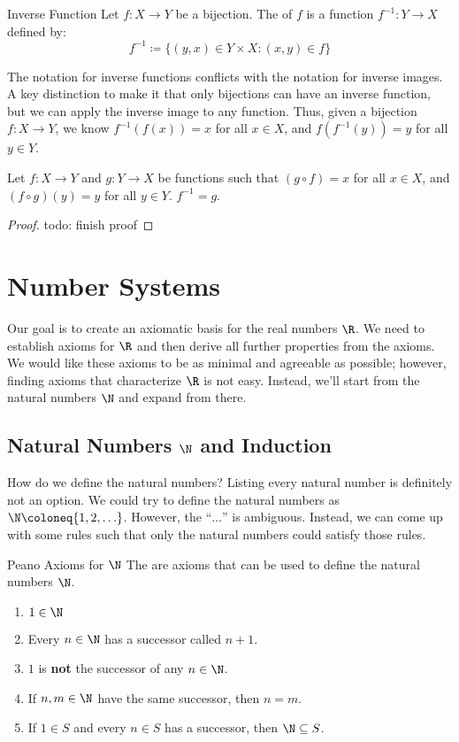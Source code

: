 \documentclass[12pt]{report}
\begin{document}
\begin{dfnbox}{Inverse Function}{}
    Let $f : X \to Y$ be a bijection. The  of $f$ is a function $f^{-1} : Y \to X$ defined by:
    \[ f^{-1} \coloneq \{ (y,x) \in Y \times X : (x,y) \in f \} \]
\end{dfnbox}

The notation for inverse functions conflicts with the notation for inverse images. A key distinction to make it that only bijections can have an inverse function, but we can apply the inverse image to any function. Thus, given a bijection $f : X \to Y$, we know $f^{-1}(f(x)) = x$ for all $x \in X$, and $f(f^{-1}(y)) = y$ for all $y \in Y$.

\begin{exbox}{}{}
    Let $f : X \to Y$ and $g : Y \to X$ be functions such that $(g \circ f) = x$ for all $x \in X$, and $(f \circ g)(y) = y$ for all $y \in Y$. $f^{-1} = g$.
    \tcblower
    \begin{proof}
        todo: finish proof
    \end{proof}
\end{exbox}

\chapter{Number Systems}
Our goal is to create an axiomatic basis for the real numbers $\R$. We need to establish axioms for $\R$ and then derive all further properties from the axioms. We would like these axioms to be as minimal and agreeable as possible; however, finding axioms that characterize $\R$ is not easy. Instead, we'll start from the natural numbers $\N$ and expand from there.

\section{Natural Numbers $\N$ and Induction}
How do we define the natural numbers? Listing every natural number is definitely not an option. We could try to define the natural numbers as $\N \coloneq \{ 1, 2, \ldots \}$. However, the ``$\ldots$'' is ambiguous. Instead, we can come up with some rules such that only the natural numbers could satisfy those rules.

\begin{dfnbox}{Peano Axioms for $\N$}{}
    The  are axioms that can be used to define the natural numbers $\N$.
    \begin{enumerate}[noitemsep]
        \item $1 \in \N$
        \item Every $n \in \N$ has a successor called $n+1$.
        \item $1$ is \textbf{not} the successor of any $n \in \N$.
        \item If $n,m \in \N$ have the same successor, then $n = m$.
        \item If $1 \in S$ and every $n \in S$ has a successor, then $\N \subseteq S$.
    \end{enumerate}
\end{dfnbox}
\end{document}

